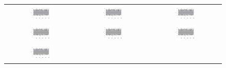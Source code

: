 \begin{figure}
\begin{tabular}{ccc}
  \includegraphics[page=7,width=0.3\textwidth]{figures/cal_trace.png} &
  \includegraphics[page=8,width=0.3\textwidth]{figures/cal_trace.png} &
  \includegraphics[page=9,width=0.3\textwidth]{figures/cal_trace.png} \\
  \includegraphics[page=10,width=0.3\textwidth]{figures/cal_trace.png} &
  \includegraphics[page=11,width=0.3\textwidth]{figures/cal_trace.png} &
  \includegraphics[page=12,width=0.3\textwidth]{figures/cal_trace.png} \\
  \includegraphics[page=13,width=0.3\textwidth]{figures/cal_trace.png} &

\end{tabular}
\end{figure}
